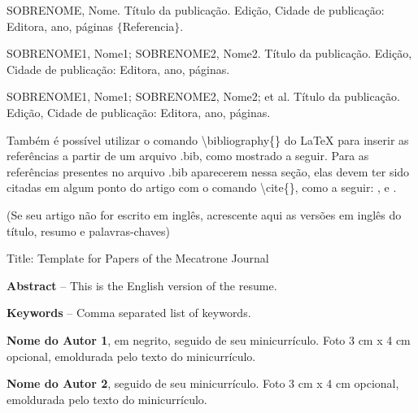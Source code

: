 \documentclass[
	article,			%
	12pt,				%
	oneside,			%
	a4paper,			%
	english,			%
	brazil,				%
	sumario=tradicional
	]{abntex2}
\begin{document}
\noindent SOBRENOME, Nome. Título da publicação.  Edição, Cidade de publicação: Editora, ano, páginas $\{ $Referencia$\} $.

\noindent SOBRENOME1, Nome1;  SOBRENOME2, Nome2.  Título da publicação.  Edição, Cidade de publicação: Editora, ano, páginas.

\noindent SOBRENOME1, Nome1;  SOBRENOME2, Nome2; et al.  Título da publicação.  Edição, Cidade de publicação: Editora, ano, páginas.

Também é possível utilizar o comando \textbackslash bibliography\{\} do LaTeX para inserir as referências a partir de um arquivo .bib, como mostrado a seguir. Para as referências presentes no arquivo .bib aparecerem nessa seção, elas devem ter sido citadas em algum ponto do artigo com o comando \textbackslash cite\{\}, como a seguir: \cite{referencia1}, \cite{referencia2} e \cite{referencia3}.

\vspace{-8mm}
\begingroup
\makeatletter
\renewcommand{\chapter}{\@gobbletwo}
\makeatother


\endgroup

(Se seu artigo não for escrito em inglês, acrescente aqui as versões em inglês do título, resumo e palavras-chaves)

\begin{changemargin}{1cm}{1cm} 

Title: Template for Papers of the Mecatrone Journal 

\textbf{Abstract} – This is the English version of the resume.

\textbf{Keywords} – Comma separated list of keywords.

\end{changemargin}


\textbf{Nome do Autor 1}, em negrito, seguido de seu minicurrículo. Foto 3 cm x 4 cm opcional, emoldurada pelo texto do minicurrículo.


\textbf{Nome do Autor 2}, seguido de seu minicurrículo. Foto 3 cm x 4 cm opcional, emoldurada pelo texto do minicurrículo.
\end{document}
